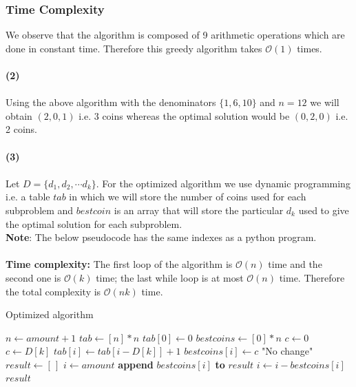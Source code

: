 \documentclass[10pt,a4paper]{article}
\begin{document}
\subsubsection*{Time Complexity}
We observe that the algorithm is composed of 9 arithmetic operations which are done in constant time. Therefore this greedy algorithm takes $\mathcal{O}(1)$ times.\\\\
\textbf{(2)}\\\\
Using the above algorithm with the denominators $\{1,6,10\}$ and $n = 12$ we will obtain $(2, 0, 1)$ i.e. $3$ coins whereas the optimal solution would be $(0,2,0)$  i.e. 2 coins.\\\\
\textbf{(3)}\\\\
Let $D = \{d_1,d_2,\cdots d_k\}$. For the optimized algorithm we use dynamic programming i.e. a table $tab$ in which we will store the number of coins used for each subproblem and $bestcoin$ is an array that will store the particular $d_k$ used to give the optimal solution for each subproblem.\\
\textbf{Note}: The below pseudocode has the same indexes as a python program.\\\\
\textbf{Time complexity:}
The first loop of the algorithm is $\mathcal{O}(n)$ time and the second one is $\mathcal{O}(k)$ time; the last while loop is at most $\mathcal{O}(n)$ time. Therefore the total complexity is $\mathcal{O}(nk)$ time.
\begin{algorithm}
\caption{Optimized algorithm}\label{ed}
\begin{algorithmic}[1]
	\State $n \gets amount + 1$
	\State $tab \gets [n]*n$ 
   	\State $tab[0] \gets 0$
   	\State $bestcoins \gets [0]*n$
        \State $c \gets 0$  
                \State $c \gets D[k]$
                \State $tab[i] \gets tab[i-D[k]]+1$
            \EndIf
        \State $bestcoins[i] \gets c$
        \EndFor
    \EndFor
    	 \Return "No change" \EndIf
    \State $result \gets [\,]$
    \State $i \gets amount$
     {
        \State \textbf{append } $bestcoins[i]$ \textbf{ to } $result$
        \State $i \gets i - bestcoins[i]$
    \EndWhile}
    \Return $result$
\EndFunction
\end{algorithmic}
\end{algorithm}
\newpage
\end{document}

